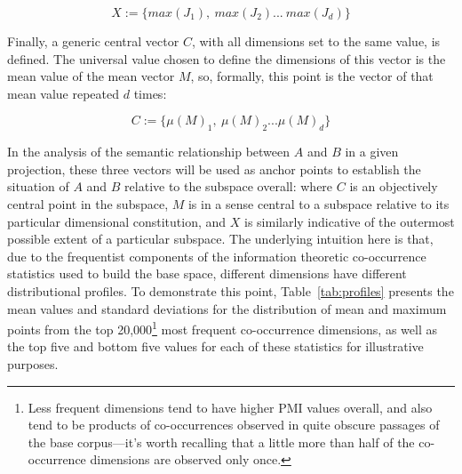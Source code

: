 \begin{equation}
X := \{max(J_{1}),\ max(J_{2})...\ max(J_{d})\}
\end{equation}

\noindent Finally, a generic central vector $C$, with all dimensions set to the same value, is defined.  The universal value chosen to define the dimensions of this vector is the mean value of the mean vector $M$, so, formally, this point is the vector of that mean value repeated $d$ times:

\begin{equation}
C := \{\mu(M)_1,\ \mu(M)_2... \mu(M)_d\}
\end{equation}

\noindent In the analysis of the semantic relationship between $A$ and $B$ in a given projection, these three vectors will be used as anchor points to establish the situation of $A$ and $B$ relative to the subspace overall: where $C$ is an objectively central point in the subspace, $M$ is in a sense central to a subspace relative to its particular dimensional constitution, and $X$ is similarly indicative of the outermost possible extent of a particular subspace.  The underlying intuition here is that, due to the frequentist components of the information theoretic co-occurrence statistics used to build the base space, different dimensions have different distributional profiles.  To demonstrate this point, Table~\ref{tab:profiles} presents the mean values and standard deviations for the distribution of mean and maximum points from the top 20,000\footnote{Less frequent dimensions tend to have higher PMI values overall, and also tend to be products of co-occurrences observed in quite obscure passages of the base corpus---it's worth recalling that a little more than half of the co-occurrence dimensions are observed only once.} most frequent co-occurrence dimensions, as well as the top five and bottom five values for each of these statistics for illustrative purposes.

